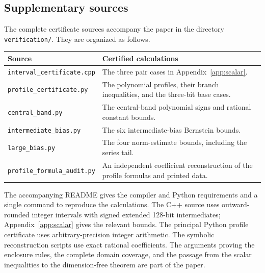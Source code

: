 \subsection{Supplementary sources}
The complete certificate sources accompany the paper in the directory
\texttt{verification/}.
They are organized as follows.
\begin{center}
\small
\begin{tabular}{@{}lp{}@{}}
\toprule
Source & Certified calculations\\
\midrule
\texttt{interval\_certificate.cpp}
 & The three pair cases in Appendix~\ref{app:scalar}.\\
\texttt{profile\_certificate.py}
 & The polynomial profiles, their branch inequalities, and the three-bit base cases.\\
\texttt{central\_band.py}
 & The central-band polynomial signs and rational constant bounds.\\
\texttt{intermediate\_bias.py}
 & The six intermediate-bias Bernstein bounds.\\
\texttt{large\_bias.py}
 & The four norm-estimate bounds, including the series tail.\\
\texttt{profile\_formula\_audit.py}
 & An independent coefficient reconstruction of the profile formulas and printed data.\\
\bottomrule
\end{tabular}
\end{center}
The accompanying README gives the compiler and Python requirements and a single command to reproduce the calculations.
The C++ source uses outward-rounded integer intervals with signed extended 128-bit intermediates; Appendix~\ref{app:scalar} gives the relevant bounds.
The principal Python profile certificate uses arbitrary-precision integer arithmetic.
The symbolic reconstruction scripts use exact rational coefficients.
The arguments proving the enclosure rules, the complete domain coverage, and the passage from the scalar inequalities to the dimension-free theorem are part of the paper.

